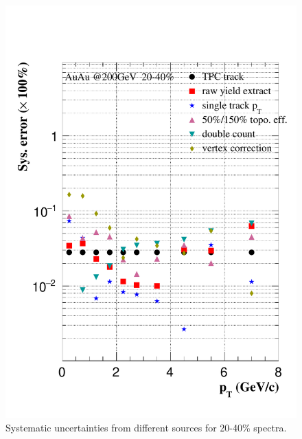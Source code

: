\begin{figure}[htbp]
\begin{minipage}[htbp]{0.47\linewidth}
\centering
\includegraphics[width=1.0\textwidth,angle=0]{figure/Run14_D0HFT/sysErr_20_40_2.pdf}
\caption{ Systematic uncertainties from different sources for 20-40\% spectra. \label{sysErr_20_40}}
\end{minipage}
\hfill
\begin{minipage}[htbp]{0.47\linewidth}
\centering

\end{minipage}
\end{figure}
